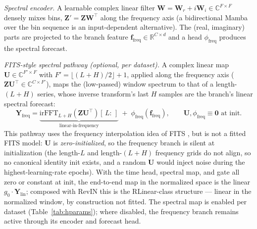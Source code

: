 \documentclass[runningheads]{llncs}
\begin{document}
\emph{Spectral encoder.} A learnable complex linear filter
$\mathbf{W} = \mathbf{W}_r + i\mathbf{W}_i \in \mathbb{C}^{F \times F}$
densely mixes bins, $\mathbf{Z}' = \mathbf{Z}\mathbf{W}^{\top}$ along the
frequency axis (a bidirectional Mamba over the bin sequence is an
input-dependent alternative). The (real, imaginary) parts are projected to
the branch feature $\mathbf{f}_{\mathrm{freq}} \in \mathbb{R}^{C \times d}$
and a head $\phi_{\mathrm{freq}}$ produces the spectral forecast.

\emph{FITS-style spectral pathway (optional, per dataset).} A
complex linear map
$\mathbf{U} \in \mathbb{C}^{F' \times F}$ with
$F' = \lfloor (L{+}H)/2 \rfloor + 1$, applied along the frequency axis
($\mathbf{Z}\mathbf{U}^{\top} \in \mathbb{C}^{C \times F'}$), maps the
(low-passed) window spectrum to that of a length-$(L{+}H)$ series, whose inverse transform's last $H$
samples are the branch's linear spectral forecast:
\begin{equation}
\mathbf{Y}_{\mathrm{freq}} =
\underbrace{\mathrm{irFFT}_{L+H}(\mathbf{Z}\mathbf{U}^{\top})[\,L{:}\,]}_{\text{linear-in-frequency}}
\; + \; \phi_{\mathrm{freq}}(\mathbf{f}_{\mathrm{freq}}),
\qquad \mathbf{U}, \phi_{\mathrm{freq}} \equiv \mathbf{0} \text{ at init.}
\label{eq:fits}
\end{equation}
This pathway uses the frequency interpolation idea of FITS \cite{fits}, but
is not a fitted FITS model: $\mathbf{U}$ is \emph{zero-initialized}, so the frequency branch
is silent at initialization (the length-$L$ and length-$(L{+}H)$ frequency
grids do not align, so no canonical identity init exists, and a random
$\mathbf{U}$ would inject noise during the highest-learning-rate epochs).
With the time head, spectral map, and gate all zero or constant at init, the
end-to-end map in the normalized space is the linear
$g_0\cdot\mathbf{Y}_{\mathrm{lin}}$; composed with RevIN this is the
RLinear-class structure \cite{rlinear,revin} --- linear in the normalized
window, by construction not fitted. The spectral map is enabled per dataset
(Table~\ref{tab:hparams}); where disabled, the frequency branch remains
active through its encoder and forecast head.
\end{document}
